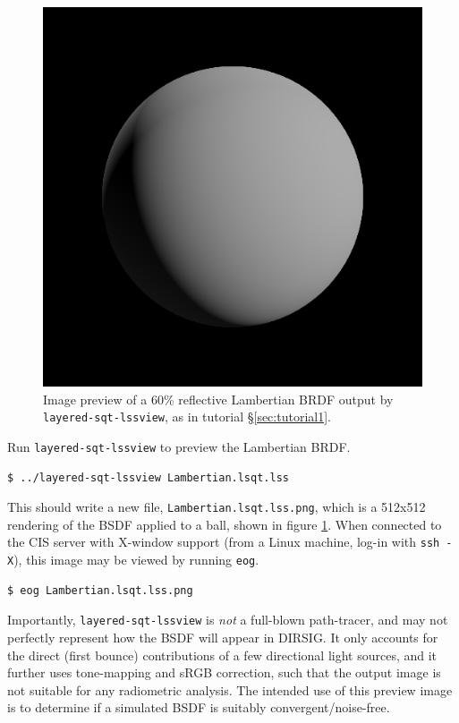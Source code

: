 \documentclass[
    twoside,
    twocolumn,
    letterpaper,
    10pt]{article}
\begin{document}
\begin{figure}
\begin{center}
    \includegraphics[width=0.75\columnwidth]{tutorial1.png}
    \caption{Image preview of a 60\% reflective Lambertian BRDF 
    output by \texttt{layered-sqt-lssview}, as in tutorial
    \S\ref{sec:tutorial1}.
    \label{fig:tutorial1}}
\end{center}
\end{figure}

Run \texttt{layered-sqt-lssview} to preview the Lambertian BRDF.
\begin{verbatim}
$ ../layered-sqt-lssview Lambertian.lsqt.lss
\end{verbatim}
This should write a new file, \texttt{Lambertian.lsqt.lss.png}, which 
is a 512x512 rendering of the BSDF applied to a ball, shown
in figure \ref{fig:tutorial1}. When connected 
to the CIS server with X-window support (from a Linux machine, log-in 
with \texttt{ssh -X}), this image may be viewed by running \texttt{eog}.
\begin{verbatim}
$ eog Lambertian.lsqt.lss.png
\end{verbatim}

Importantly, \texttt{layered-sqt-lssview} is \emph{not} a full-blown
path-tracer, and may not perfectly represent how the BSDF will appear
in DIRSIG. It only accounts for the direct (first bounce) contributions 
of a few directional light sources, and it further uses tone-mapping and
sRGB correction, such that the output image is not suitable for any
radiometric analysis. The intended use of this preview image is to 
determine if a simulated BSDF is suitably convergent/noise-free.
\end{document}
